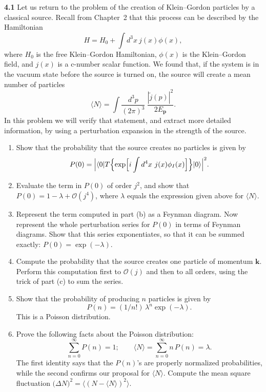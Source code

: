 \textbf{4.1} Let us return to the problem of the creation of Klein--Gordon
particles by a classical source.  Recall from Chapter~2 that this process can
be described by the Hamiltonian
\begin{equation}
  H = H_0 + \int d^3x\ j(x)\phi(x) ,
\end{equation}
where $H_0$ is the free Klein--Gordon Hamiltonian, $\phi(x)$ is the
Klein--Gordon field, and $j(x)$ is a c-number scalar function.  We found
that, if the system is in the vacuum state before the source is turned on,
the source will create a mean number of particles
\begin{equation}
  \langle N\rangle = \int \frac{d^3p}{(2\pi)^3}\
    \frac{|\tilde{j}(p)|^2}{2E_{\mathbf{p}}} .
\end{equation}
In this problem we will verify that statement, and extract more detailed
information, by using a perturbation expansion in the strength of the source.
\begin{enumerate}[label=(\alph*)]
  \item Show that the probability that the source creates no particles is
    given by
    \begin{equation}
      P(0) = \Bigl| \langle 0|T\Bigl\{ \exp\Bigl[ i\int d^4x\
        j(x)\phi_I(x) \Bigr] \Bigr\}|0\rangle \Bigr|^2 .
    \end{equation}
  \item Evaluate the term in $P(0)$ of order $j^2$, and show that
    $P(0) = 1 - \lambda + \mathcal{O}(j^4)$, where $\lambda$ equals the
    expression given above for $\langle N\rangle$.
  \item Represent the term computed in part (b) as a Feynman diagram.  Now
    represent the whole perturbation series for $P(0)$ in terms of Feynman
    diagrams.  Show that this series exponentiates, so that it can be summed
    exactly: $P(0) = \exp(-\lambda)$.
  \item Compute the probability that the source creates one particle of
    momentum $\mathbf{k}$.  Perform this computation first to
    $\mathcal{O}(j)$ and then to all orders, using the trick of part (c) to
    sum the series.
  \item Show that the probability of producing $n$ particles is given by
    \begin{equation}
      P(n) = (1/n!)\,\lambda^n\exp(-\lambda) .
    \end{equation}
    This is a Poisson distribution.
  \item Prove the following facts about the Poisson distribution:
    \begin{equation}
      \sum_{n=0}^{\infty}P(n) = 1;\qquad
      \langle N\rangle = \sum_{n=0}^{\infty} n\,P(n) = \lambda .
    \end{equation}
    The first identity says that the $P(n)$'s are properly normalized
    probabilities, while the second confirms our proposal for $\langle N\rangle$.
    Compute the mean square fluctuation
    $\bigl( \Delta N \bigr)^2 = \langle (N - \langle N\rangle)^2 \rangle$.
\end{enumerate}

